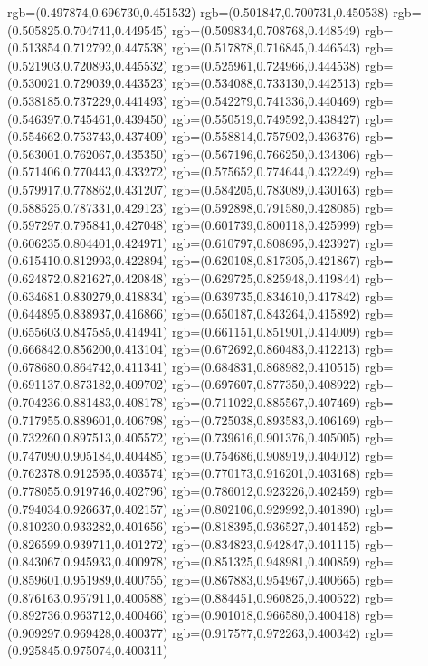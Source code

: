 {{{			rgb=(0.497874,0.696730,0.451532)
			rgb=(0.501847,0.700731,0.450538)
			rgb=(0.505825,0.704741,0.449545)
			rgb=(0.509834,0.708768,0.448549)
			rgb=(0.513854,0.712792,0.447538)
			rgb=(0.517878,0.716845,0.446543)
			rgb=(0.521903,0.720893,0.445532)
			rgb=(0.525961,0.724966,0.444538)
			rgb=(0.530021,0.729039,0.443523)
			rgb=(0.534088,0.733130,0.442513)
			rgb=(0.538185,0.737229,0.441493)
			rgb=(0.542279,0.741336,0.440469)
			rgb=(0.546397,0.745461,0.439450)
			rgb=(0.550519,0.749592,0.438427)
			rgb=(0.554662,0.753743,0.437409)
			rgb=(0.558814,0.757902,0.436376)
			rgb=(0.563001,0.762067,0.435350)
			rgb=(0.567196,0.766250,0.434306)
			rgb=(0.571406,0.770443,0.433272)
			rgb=(0.575652,0.774644,0.432249)
			rgb=(0.579917,0.778862,0.431207)
			rgb=(0.584205,0.783089,0.430163)
			rgb=(0.588525,0.787331,0.429123)
			rgb=(0.592898,0.791580,0.428085)
			rgb=(0.597297,0.795841,0.427048)
			rgb=(0.601739,0.800118,0.425999)
			rgb=(0.606235,0.804401,0.424971)
			rgb=(0.610797,0.808695,0.423927)
			rgb=(0.615410,0.812993,0.422894)
			rgb=(0.620108,0.817305,0.421867)
			rgb=(0.624872,0.821627,0.420848)
			rgb=(0.629725,0.825948,0.419844)
			rgb=(0.634681,0.830279,0.418834)
			rgb=(0.639735,0.834610,0.417842)
			rgb=(0.644895,0.838937,0.416866)
			rgb=(0.650187,0.843264,0.415892)
			rgb=(0.655603,0.847585,0.414941)
			rgb=(0.661151,0.851901,0.414009)
			rgb=(0.666842,0.856200,0.413104)
			rgb=(0.672692,0.860483,0.412213)
			rgb=(0.678680,0.864742,0.411341)
			rgb=(0.684831,0.868982,0.410515)
			rgb=(0.691137,0.873182,0.409702)
			rgb=(0.697607,0.877350,0.408922)
			rgb=(0.704236,0.881483,0.408178)
			rgb=(0.711022,0.885567,0.407469)
			rgb=(0.717955,0.889601,0.406798)
			rgb=(0.725038,0.893583,0.406169)
			rgb=(0.732260,0.897513,0.405572)
			rgb=(0.739616,0.901376,0.405005)
			rgb=(0.747090,0.905184,0.404485)
			rgb=(0.754686,0.908919,0.404012)
			rgb=(0.762378,0.912595,0.403574)
			rgb=(0.770173,0.916201,0.403168)
			rgb=(0.778055,0.919746,0.402796)
			rgb=(0.786012,0.923226,0.402459)
			rgb=(0.794034,0.926637,0.402157)
			rgb=(0.802106,0.929992,0.401890)
			rgb=(0.810230,0.933282,0.401656)
			rgb=(0.818395,0.936527,0.401452)
			rgb=(0.826599,0.939711,0.401272)
			rgb=(0.834823,0.942847,0.401115)
			rgb=(0.843067,0.945933,0.400978)
			rgb=(0.851325,0.948981,0.400859)
			rgb=(0.859601,0.951989,0.400755)
			rgb=(0.867883,0.954967,0.400665)
			rgb=(0.876163,0.957911,0.400588)
			rgb=(0.884451,0.960825,0.400522)
			rgb=(0.892736,0.963712,0.400466)
			rgb=(0.901018,0.966580,0.400418)
			rgb=(0.909297,0.969428,0.400377)
			rgb=(0.917577,0.972263,0.400342)
			rgb=(0.925845,0.975074,0.400311)
}}}
